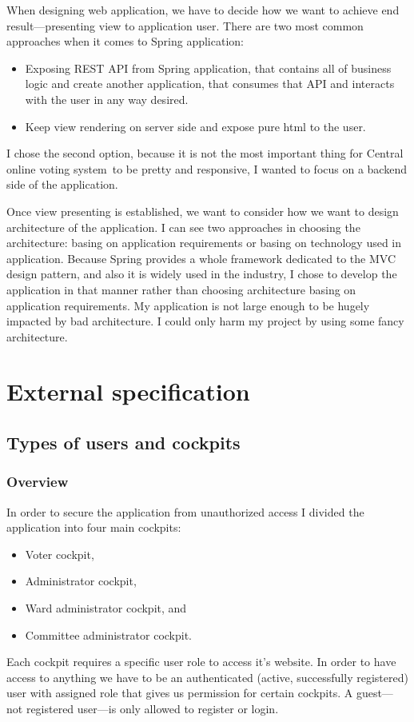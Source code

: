 \documentclass[a4paper,twoside,12pt]{book}
\newcommand{\Title}{Central online voting system}
\begin{document}
    When designing web application, we have to decide how we want to achieve end result---presenting view to application user.
    There are two most common approaches when it comes to Spring application:
    \begin{itemize}
      \item Exposing REST API from Spring application, that contains all of business logic and create another application, that consumes that API and interacts with the user in any way desired.
      \item Keep view rendering on server side and expose pure html to the user.
    \end{itemize}
    I chose the second option, because it is not the most important thing for \Title\ to be pretty and responsive, I wanted to focus on a backend side of the application.

    Once view presenting is established, we want to consider how we want to design architecture of the application.
    I can see two approaches in choosing the architecture: basing on application requirements or basing on technology used in application.
    Because Spring provides a whole framework dedicated to the MVC design pattern, and also it is widely used in the industry, I chose to develop the application in that manner
    rather than choosing architecture basing on application requirements. 
    My application is not large enough to be hugely impacted by bad architecture. I could only harm my project by using some fancy architecture.

\chapter{External specification}
  \section{Types of users and cockpits}
    \subsection{Overview}
    In order to secure the application from unauthorized access  I divided the application into four main cockpits:
    \begin{itemize}
      \item Voter cockpit,
      \item Administrator cockpit,
      \item Ward administrator cockpit, and
      \item Committee administrator cockpit.
    \end{itemize}
    Each cockpit requires a specific user role to access it's website.
    In order to have access to anything we have to be an authenticated (active, successfully registered) user with assigned role that gives us permission for certain cockpits.
    A guest---not registered user---is only allowed to register or login.
\end{document}
